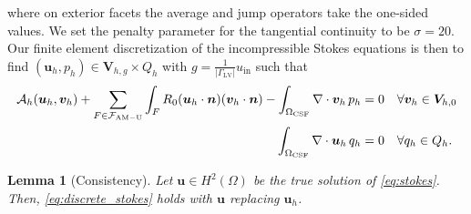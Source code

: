 \documentclass[11pt, dvipsnames]{amsart}
\newtheorem{lemma}{Lemma}
\begin{document}
where on exterior facets the average and jump operators take the one-sided values. We set the penalty parameter for the tangential continuity to be $\sigma = 20$. Our finite element discretization of the incompressible Stokes equations is then to find $(\bm u_h, p_h) \in \bm V_{h,g} \times Q_h$ with $g  = \frac{1}{|\Gamma_{\mathrm{LV}}|} u_{\mathrm{in}}$  such that 
\begin{subequations}
\label{eq:discrete_stokes}
\begin{align}
  \mathcal{A}_h(\bm u_h, \bm v_h)
  + \sum_{F \in \mathcal{F}_{\rm AM-U}} \int_{F} R_0 (\bm u_h \cdot \bm n) (\bm v_h \cdot \bm n)
  - \int_{\Omega_{\rm CSF}} \nabla \cdot \bm v_h \, p_h  &= 0 \quad \forall \bm v_h \in \bm V_{h,0} \\ 
\int_{\Omega_{\rm CSF}} \nabla \cdot \bm u_h \, q_h  &= 0 \quad \forall q_h \in Q_h.
\end{align}
\end{subequations}

\begin{lemma}[Consistency]
Let $\bm u \in H^2(\Omega)$ be the true solution of  \eqref{eq:stokes}. Then, \eqref{eq:discrete_stokes} holds with $\bm u$ replacing $\bm u_h$. 
\end{lemma}
\end{document}
